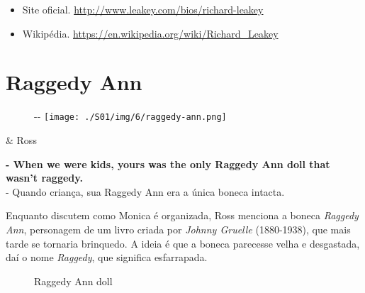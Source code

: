 \begin{itemize}
\tightlist
\item
  \sloppy Site oficial. \url{http://www.leakey.com/bios/richard-leakey}
\item
  \sloppy Wikipédia. \url{https://en.wikipedia.org/wiki/Richard_Leakey}
\end{itemize}

\hypertarget{raggedy-ann}{%
\section{Raggedy Ann}\label{raggedy-ann}}

\begin{figure}[!ht]
  \begin{adjustwidth}{-\oddsidemargin-1in}{-\rightmargin}
    \centering
    \texttt{[image: ./S01/img/6/raggedy-ann.png]}
  \end{adjustwidth}
\end{figure}

\begin{tcolorbox}[enhanced,center upper,
    drop fuzzy shadow southeast, boxrule=0.3pt,
    lower separated=false,
    colframe=black!30!dialogoBorder,colback=white]
\begin{minipage}[c]{0.16\linewidth}
   & \centering \scriptsize{Ross}
\end{minipage}
\hfill
\begin{minipage}[c]{0.8\linewidth}
  \textbf{- When we were kids, yours was the only Raggedy Ann doll that wasn't raggedy.}\\
  - Quando criança, sua Raggedy Ann era a única boneca intacta.
\end{minipage}
\end{tcolorbox}

Enquanto discutem como Monica é organizada, Ross menciona a boneca
\emph{Raggedy Ann}, personagem de um livro criada por \emph{Johnny
Gruelle} (1880-1938), que mais tarde se tornaria brinquedo. A ideia é
que a boneca parecesse velha e desgastada, daí o nome \emph{Raggedy},
que significa esfarrapada.

\begin{figure}
  \centering
    \caption{Raggedy Ann doll\label{fig:raggedy-ann-doll}}
\end{figure}

